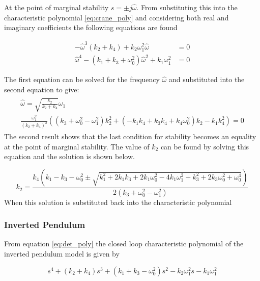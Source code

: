\documentclass{article}
\begin{document}
At the point of marginal stability $s = \pm j\hat{\omega}$.
From substituting this into the characteristic polynomial \ref{eq:crane_poly} and considering both real and imaginary coefficients the following equations are found

\begin{align}
    - \hat{\omega}^{3} \left(k_{2} + k_{4}\right) + k_{2} \omega_{1}^{2} \hat{\omega}  &= 0 \\
    \hat{\omega}^{4} - \left(k_{1} + k_{3} + \omega_{0}^{2}\right)\hat{\omega}^{2} + k_{1} \omega_{1}^{2} &= 0
\end{align}

The first equation can be solved for the frequency $\hat{\omega}$ and substituted into the second equation to give:
\begin{align}
  \begin{gathered}
    \hat{\omega} = \sqrt{\frac{k_2}{k_2 + k_4}} \omega_1 \label{eq:marginal_stability_frequency}\\
    \frac{\omega_1^2}{(k_2+k_4)^2} \left( \left(k_{3} + \omega_{0}^{2} - \omega_{1}^{2}\right) k_{2}^{2} + \left(- k_{1} k_{4} + k_{3} k_{4} + k_{4} \omega_{0}^{2}\right) k_{2} -  k_{1} k_{4}^{2} \right) = 0
  \end{gathered}
\end{align}
The second result shows that the last condition for stability becomes an equality at the point of marginal stability.
The value of $k_2$ can be found by solving this equation and the solution is shown below.

\begin{equation}
  k_2 = \frac{k_{4} \left(k_{1} - k_{3} - \omega_{0}^{2} \pm \sqrt{k_{1}^{2} + 2 k_{1} k_{3} + 2 k_{1} \omega_{0}^{2} - 4 k_{1} \omega_{1}^{2} + k_{3}^{2} + 2 k_{3} \omega_{0}^{2} + \omega_{0}^{4}}\right)}{2 \left(k_{3} + \omega_{0}^{2} - \omega_{1}^{2}\right)}
  \label{eq:predicted_crane_k2}
\end{equation}
When this solution is substituted back into the characteristic polynomial

\subsubsection{Inverted Pendulum}

From equation \ref{eq:det_poly} the closed loop characteristic polynomial of the inverted pendulum model is given by

\begin{equation}
  s^{4} + \left(k_{2} + k_{4}\right) s^{3} + \left(k_{1} + k_{3} - \omega_{0}^{2}\right) s^{2} -  k_{2} \omega_{1}^{2} s -  k_{1} \omega_{1}^{2}
  \label{eq:pendulum_poly}
\end{equation}
\end{document}
